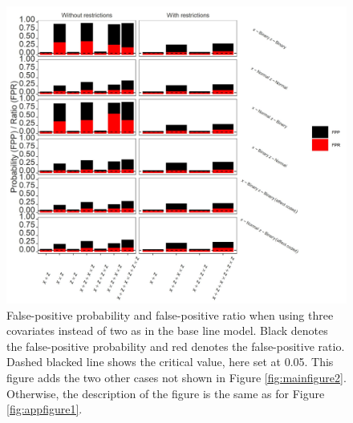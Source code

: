 \begin{figure}[ht!]
\includegraphics[width=1\textwidth]{R/Analysis/Result/Figures/Figure1CSI.jpeg}
\centering
\caption{False-positive probability and false-positive ratio when using three covariates instead of two as in the base line model. Black denotes the false-positive probability and red denotes the false-positive ratio. Dashed blacked line shows the critical value, here set at 0.05. This figure adds the two other cases not shown in Figure \ref{fig:mainfigure2}. Otherwise, the description of the figure is the same as for Figure \ref{fig:appfigure1}.
}
\label{fig:appfigure5}
\end{figure}

